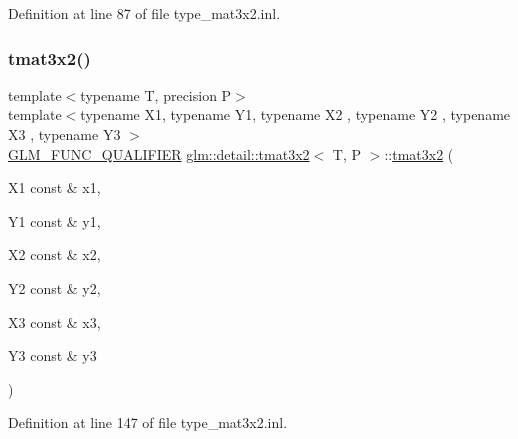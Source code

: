 Definition at line 87 of file type\+\_\+mat3x2.\+inl.

\mbox{\label{structglm_1_1detail_1_1tmat3x2_ae3a805c23b230b65cc49d3a3d7ca027a}} 
\subsubsection{\texorpdfstring{tmat3x2()}{tmat3x2()}\hspace{0.1cm}{\footnotesize\ttfamily [20/22]}}
{\footnotesize\ttfamily template$<$typename T, precision P$>$ \\
template$<$typename X1, typename Y1, typename X2 , typename Y2 , typename X3 , typename Y3 $>$ \\
\hyperlink{setup_8hpp_a33fdea6f91c5f834105f7415e2a64407}{G\+L\+M\+\_\+\+F\+U\+N\+C\+\_\+\+Q\+U\+A\+L\+I\+F\+I\+ER} \hyperlink{structglm_1_1detail_1_1tmat3x2}{glm\+::detail\+::tmat3x2}$<$ T, P $>$\+::\hyperlink{structglm_1_1detail_1_1tmat3x2}{tmat3x2} (\begin{DoxyParamCaption}\item[{X1 const \&}]{x1,  }\item[{Y1 const \&}]{y1,  }\item[{X2 const \&}]{x2,  }\item[{Y2 const \&}]{y2,  }\item[{X3 const \&}]{x3,  }\item[{Y3 const \&}]{y3 }\end{DoxyParamCaption})}



Definition at line 147 of file type\+\_\+mat3x2.\+inl.

\mbox{\label{structglm_1_1detail_1_1tmat3x2_a701537988a37657db53fd40d9b68d364}} 
